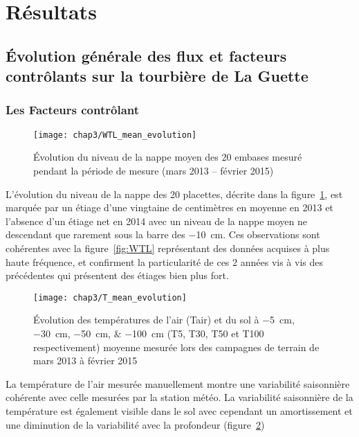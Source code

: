\section{Résultats}

\subsection{Évolution générale des flux et facteurs contrôlants sur la tourbière de La Guette}

\subsubsection{Les Facteurs contrôlant}

\begin{figure}
\centering
\texttt{[image: chap3/WTL\_mean\_evolution]}
\caption{Évolution du niveau de la nappe moyen des 20 embases mesuré pendant la période de mesure (mars 2013 -- février 2015)}
\label{fig:WTL_mean_evolution}
\end{figure}

L'évolution du niveau de la nappe des 20 placettes, décrite dans la figure~\ref{fig:WTL_mean_evolution}, est marquée par un étiage d'une vingtaine de centimètres en moyenne en 2013 et l'absence d'un étiage net en 2014 avec un niveau de la nappe moyen ne descendant que rarement sous la barre des \SI{-10}{\cm}.
Ces observations sont cohérentes avec la figure~\ref{fig:WTL} représentant des données acquises à plus haute fréquence, et confirment la particularité de ces 2 années vis à vis des précédentes qui présentent des étiages bien plus fort.

\begin{figure}
\centering
\texttt{[image: chap3/T\_mean\_evolution]}
\caption{Évolution des températures de l'air (Tair) et du sol à \SIlist{-5;-30;-50;-100}{\centi\metre} (T5, T30, T50 et T100 respectivement) moyenne mesurée lors des campagnes de terrain de mars 2013 à février 2015}
\label{fig:T_mean_evolution}
\end{figure}

La température de l'air mesurée manuellement montre une variabilité saisonnière cohérente avec celle mesurées par la station météo. 
La variabilité saisonnière de la température est également visible dans le sol avec cependant un amortissement et une diminution de la variabilité avec la profondeur (figure~\ref{fig:T_mean_evolution})

